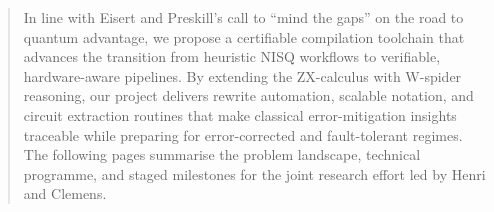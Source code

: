 \begin{abstract}
In line with Eisert and Preskill's call to ``mind the gaps'' on the road to quantum advantage, we propose a certifiable compilation toolchain that advances the transition from heuristic NISQ workflows to verifiable, hardware-aware pipelines. By extending the ZX-calculus with W-spider reasoning, our project delivers rewrite automation, scalable notation, and circuit extraction routines that make classical error-mitigation insights traceable while preparing for error-corrected and fault-tolerant regimes. The following pages summarise the problem landscape, technical programme, and staged milestones for the joint research effort led by Henri and Clemens.
\end{abstract}
